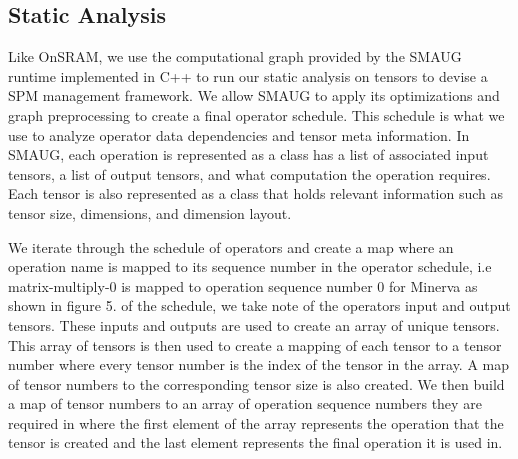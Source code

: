 

\subsection{Static Analysis}

Like OnSRAM, we use the computational graph provided by the SMAUG runtime
implemented in C++ to run our static analysis on tensors to devise a SPM
management framework. We allow SMAUG to apply its optimizations and graph
preprocessing to create a final operator schedule. This schedule is what we use
to analyze operator data dependencies and tensor meta information. In SMAUG,
each operation is represented as a class has a list of associated input
tensors, a list of output tensors, and what computation the operation requires.
Each tensor is also represented as a class that holds relevant information such
as tensor size, dimensions, and dimension layout.






We iterate through the schedule of operators and create a map where an
operation name is mapped to its sequence number in the operator schedule, i.e
matrix-multiply-0 is mapped to operation sequence number 0 for Minerva as shown
in figure 5. %
of the schedule, we take note of the operators input and output tensors. These inputs
and outputs are used to create an array of unique tensors. This array of
tensors is then used to create a mapping of each tensor to a tensor number
where every tensor number is the index of the tensor in the array. A map of 
tensor numbers to the corresponding tensor size is also created. We then
build a map of tensor numbers to an array of operation sequence numbers they are
required in where the first element of the array represents the operation that
the tensor is created and the last element represents the final operation
it is used in.

